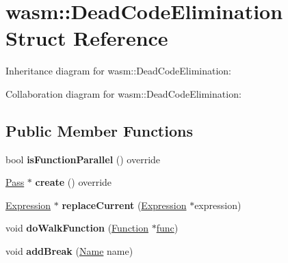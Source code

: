 \hypertarget{structwasm_1_1_dead_code_elimination}{}\section{wasm\+:\+:Dead\+Code\+Elimination Struct Reference}
\label{structwasm_1_1_dead_code_elimination}


Inheritance diagram for wasm\+:\+:Dead\+Code\+Elimination\+:


Collaboration diagram for wasm\+:\+:Dead\+Code\+Elimination\+:
\subsection*{Public Member Functions}
\begin{DoxyCompactItemize}
\item 
\mbox{\label{structwasm_1_1_dead_code_elimination_ab3c64aab4c41f88aba7b765f989b8c84}} 
bool {\bfseries is\+Function\+Parallel} () override
\item 
\mbox{\label{structwasm_1_1_dead_code_elimination_ab0cac129d1e374446aac017496f08dfa}} 
\mbox{\hyperlink{classwasm_1_1_pass}{Pass}} $\ast$ {\bfseries create} () override
\item 
\mbox{\label{structwasm_1_1_dead_code_elimination_a42bbd803c8186b69643644fde1b26b3e}} 
\mbox{\hyperlink{classwasm_1_1_expression}{Expression}} $\ast$ {\bfseries replace\+Current} (\mbox{\hyperlink{classwasm_1_1_expression}{Expression}} $\ast$expression)
\item 
\mbox{\label{structwasm_1_1_dead_code_elimination_ab615d245bf8f8c3a4e13a0808ef2d7ec}} 
void {\bfseries do\+Walk\+Function} (\mbox{\hyperlink{classwasm_1_1_function}{Function}} $\ast$\mbox{\hyperlink{structfunc}{func}})
\item 
\mbox{\label{structwasm_1_1_dead_code_elimination_a45ee02fc2de53026cb30de6947e9e5d6}} 
void {\bfseries add\+Break} (\mbox{\hyperlink{structwasm_1_1_name}{Name}} name)
\item 
\mbox{\label{structwasm_1_1_dead_code_elimination_a053b75e482a7e92e3a1e7f4d7dfb1f87}} 

\end{DoxyCompactItemize}
